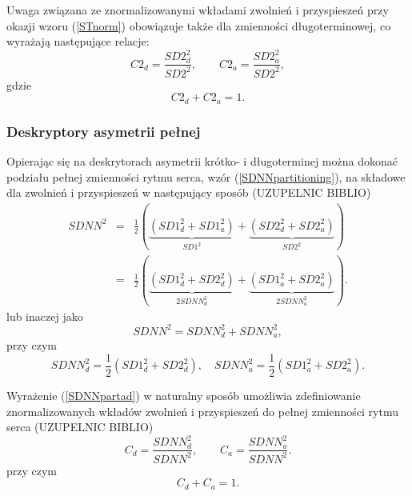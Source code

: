 Uwaga związana ze znormalizowanymi wkładami zwolnień i przyspieszeń przy okazji wzoru (\ref{STnorm})
obowiązuje także dla zmienności długoterminowej, co wyrażają następujące relacje:
\begin{equation}
C2_{d}=\frac{SD2_{d}^{2}}{SD2^{2}}, \qquad C2_{a}=\frac{SD2_{a}^{2}}{SD2^{2}},\label{LTnorm}
\end{equation}
gdzie
\begin{equation}
C2_{d}+C2_{a}=1.
\end{equation}

\subsubsection{Deskryptory asymetrii pełnej}
Opierając się na deskrytorach asymetrii krótko- i długoterminej można dokonać podziału
pełnej zmienności rytmu serca, wzór (\ref{SDNNpartitioning}), na składowe dla zwolnień i
przyspieszeń w następujący sposób (UZUPELNIC BIBLIO)
\begin{eqnarray}
SDNN^{2}&=&\frac{1}{2}\left(\underbrace{(SD1_{d}^{2}+SD1_{a}^{2})}_{SD1^{2}}+\underbrace{(SD2_{d}^{2}+SD2_{a}^{2})}_{SD2^{2}}\right)\\
&=&\frac{1}{2}\left(\underbrace{(SD1_{d}^{2}+SD2_{d}^{2})}_{2SDNN_{d}^{2}}+\underbrace{(SD1_{a}^{2}+SD2_{a}^{2})}_{2 SDNN_{a}^{2}}\right).\nonumber
\end{eqnarray}
lub inaczej jako
\begin{equation}
SDNN^{2}=SDNN_{d}^{2}+SDNN_{a}^{2}, \label{SDNNpart}
\end{equation}
przy czym 
\begin{equation}
SDNN_{d}^2=\frac{1}{2}\left(SD1_{d}^{2}+SD2_{d}^{2}\right),\quad SDNN_{a}^2=\frac{1}{2}\left(SD1_{a}^{2}+SD2_{a}^{2}\right). \label{SDNNpartad}
\end{equation}

Wyrażenie (\ref{SDNNpartad}) w naturalny sposób umożliwia zdefiniowanie	znormalizowanych
wkładów zwolnień i przyspieszeń do pełnej zmienności rytmu serca (UZUPELNIC BIBLIO)
\begin{equation}
C_{d}= \frac{SDNN_{d}^{2}}{SDNN^{2}},\qquad C_{a}= \frac{SDNN_{a}^{2}}{SDNN^{2}}\label{SDNNcontrib}.
\end{equation}
przy czym
\begin{equation}
C_{d}+C_{a}=1.
\end{equation}

